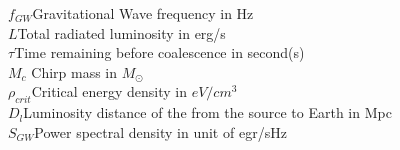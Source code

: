$f_{GW}$\hspace{3.6cm}Gravitational Wave frequency in Hz\\
$L$\hspace{4.1cm}Total radiated luminosity in erg/s\\
$\tau$\hspace{4.15cm}Time remaining before coalescence in second(s)\\
$M_{c}$\hspace{3.7cm} Chirp mass in $M_{\odot}$\\
$\rho_{crit}$\hspace{3.7cm}Critical energy density in  $eV/cm^{3}$\\
$D_l$\hspace{4cm}Luminosity distance of the from the source to Earth in Mpc \\
$S_{GW}$\hspace{3.6cm}Power spectral density in unit of egr/sHz\\

